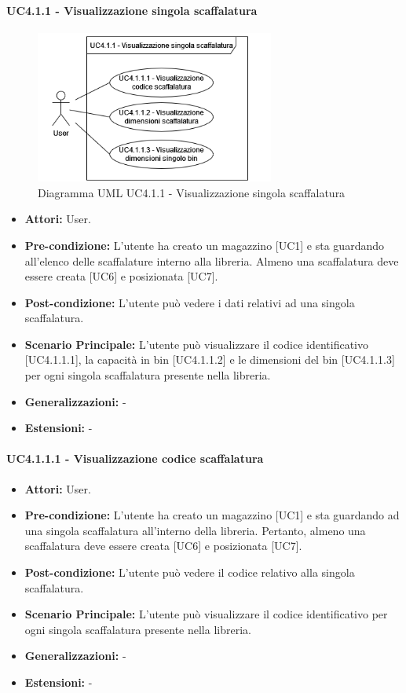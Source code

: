\paragraph{UC4.1.1 - Visualizzazione singola scaffalatura}
\begin{figure}[H]
  \centering
  \includegraphics[width=0.7\textwidth]{UC_diagrams_1-10/UC4.1.1.drawio.png}
   \caption{Diagramma UML UC4.1.1 - Visualizzazione singola scaffalatura}
\end{figure}
\begin{itemize}
    \item \textbf{Attori:} User.
    \item \textbf{Pre-condizione:} L'utente ha creato un magazzino [UC1] e sta guardando all'elenco delle scaffalature interno alla libreria. Almeno una scaffalatura deve essere creata [UC6] e posizionata [UC7].
    \item \textbf{Post-condizione:} L'utente può vedere i dati relativi ad una singola scaffalatura.
    \item \textbf{Scenario Principale:} L'utente può visualizzare il codice identificativo [UC4.1.1.1], la capacità in bin [UC4.1.1.2] e le dimensioni del bin [UC4.1.1.3] per ogni singola scaffalatura presente nella libreria.
    \item \textbf{Generalizzazioni:} -
    \item \textbf{Estensioni:} -
\end{itemize}


\paragraph{UC4.1.1.1 - Visualizzazione codice scaffalatura}
\begin{itemize}
    \item \textbf{Attori:} User.
    \item \textbf{Pre-condizione:} L'utente ha creato un magazzino [UC1] e sta guardando ad una singola scaffalatura all'interno della libreria. Pertanto, almeno una scaffalatura deve essere creata [UC6] e posizionata [UC7].
    \item \textbf{Post-condizione:} L'utente può vedere il codice relativo alla singola scaffalatura.
    \item \textbf{Scenario Principale:} L'utente può visualizzare il codice identificativo per ogni singola scaffalatura presente nella libreria.
    \item \textbf{Generalizzazioni:} -
    \item \textbf{Estensioni:} -
\end{itemize}


